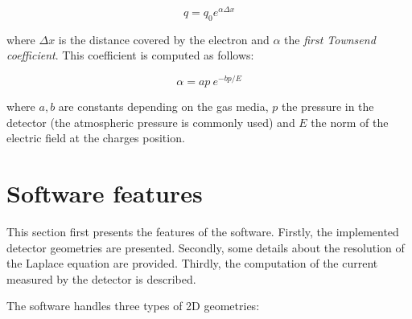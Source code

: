 \documentclass[11pt]{article}
\begin{document}
	\begin{equation}
		q = q_0 e^{\alpha \Delta x}
		\label{eq:townsend}
	\end{equation}

	where $\Delta x$ is the distance covered by the electron and $\alpha$ the
	\textit{first Townsend coefficient}. This coefficient is computed as follows:

	\[\alpha = ap \ e^{-bp/E}\]

	where $a, b$ are constants depending on the gas media, $p$ the pressure in
	the detector (the atmospheric pressure is commonly used) and $E$ the norm
	of the electric field at the charges position.

\section{Software features}
\label{sec:features}

	This section first presents the features of the software. Firstly,
	the implemented detector geometries are presented. Secondly, some details
	about the resolution of the Laplace equation are provided. Thirdly, the
	computation of the current measured by the detector is described.

	The software handles three types of 2D geometries:
\end{document}
